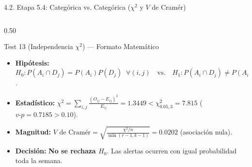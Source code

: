 \documentclass[aspectratio=169, 9pt]{beamer}
\begin{document}
\begin{frame}{4.2. Etapa 5.4: Categórica vs. Categórica ($\chi^2$ y $V$ de Cramér)}
\begin{columns}[T]
\begin{column}{0.50\textwidth}
    \begin{exampleblock}{\footnotesize Test 13 (Independencia $\chi^2$) — Formato Matemático}
      \scriptsize
      \begin{itemize}\setlength{\itemsep}{1pt}
        \item \textbf{Hipótesis:} $H_0: P(A_i \cap D_j) = P(A_i)P(D_j) \;\;\forall (i,j) \quad \text{vs.} \quad H_1: P(A_i \cap D_j) \neq P(A_i)P(D_j)$.
        \item \textbf{Estadístico:} $\chi^2 = \sum_{i,j}\frac{(O_{ij}-E_{ij})^2}{E_{ij}} = \mathbf{1.3449} < \chi^2_{0.05, 3} = 7.815$ ($v\text{-}p = \mathbf{0.7185} > 0.10$).
        \item \textbf{Magnitud:} $V \text{ de Cramér} = \sqrt{\frac{\chi^2/n}{\min(r-1, k-1)}} = \mathbf{0.0202}$ (asociación nula).
        \item \textbf{Decisión:} \textbf{No se rechaza $H_0$}. Las alertas ocurren con igual probabilidad toda la semana.
      \end{itemize}
    \end{exampleblock}
  \end{column}
\end{columns}
\end{frame}
\end{document}
